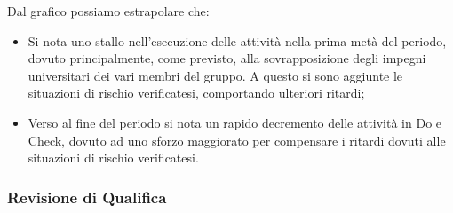 Dal grafico possiamo estrapolare che:
\begin{itemize}
	\item Si nota uno stallo nell'esecuzione delle attività nella prima metà del periodo, dovuto principalmente, come previsto, alla sovrapposizione degli impegni universitari dei vari membri del gruppo. A questo si sono aggiunte le situazioni di rischio verificatesi, comportando ulteriori ritardi;
	\item Verso al fine del periodo si nota un rapido decremento delle attività in Do e Check, dovuto ad uno sforzo maggiorato per compensare i ritardi dovuti alle situazioni di rischio verificatesi.
\end{itemize}

\subsubsection{Revisione di Qualifica}
